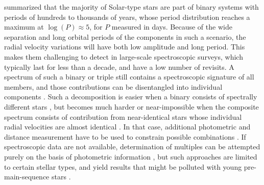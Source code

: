 \citet{2013ARA&A..51..269D} summarized that the majority of Solar-type stars are part of binary systems with periods of hundreds to thousands of years, whose period distribution reaches a maximum at $\log(P)\approx5$, for $P$ measured in days. Because of the wide separation and long orbital periods of the components in such a scenario, the radial velocity variations will have both low amplitude and long period. This makes them challenging to detect in large-scale spectroscopic surveys, which typically last for less than a decade, and have a low number of revisits. A spectrum of such a binary or triple still contains a spectroscopic signature of all members, and those contributions can be disentangled into individual components \cite{2018MNRAS.473.5043E, 2018MNRAS.476..528E}. Such a decomposition is easier when a binary consists of spectrally different stars \cite{2005A&A...440..995S, 2007MNRAS.382.1377R, 2012MNRAS.419..806R, 2013AJ....146...82R, 2016MNRAS.458.3808R}, but becomes much harder or near-impossible when the composite spectrum consists of contribution from near-identical stars whose individual radial velocities are almost identical \cite{2015IJAsB..14..173B}. In that case, additional photometric and distance measurement have to be used to constrain possible combinations \cite{2018ApJ...857..114W}. If spectroscopic data are not available, determination of multiples can be attempted purely on the basis of photometric information \cite{1997A&A...327..598F, 1998MNRAS.300..977H, 2016MNRAS.455.3009M, 2018ApJ...857..114W}, but such approaches are limited to certain stellar types, and yield results that might be polluted with young pre-main-sequence stars \cite{2018arXiv181010435Z}.


